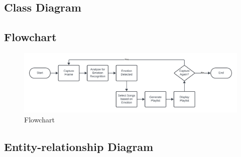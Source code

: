 \subsection{Class Diagram}
\subsection{Flowchart}
\begin{figure}[!ht]
    \centering
    \includegraphics[width=14cm]{Images/flowchart.png}
    \caption{Flowchart}
    \label{fig:flowchart}
\end{figure}
\subsection{Entity-relationship Diagram}
